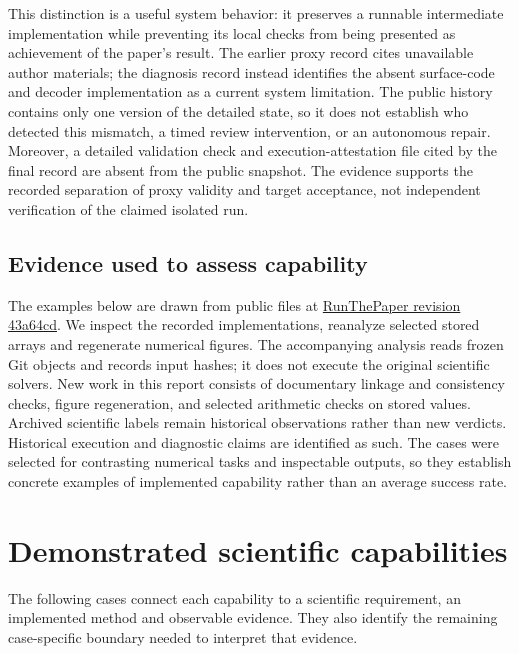 \documentclass[10pt,a4paper]{article}
\begin{document}
This distinction is a useful system behavior: it preserves a runnable
intermediate implementation while preventing its local checks from being
presented as achievement of the paper's result. The earlier proxy record
cites unavailable author materials; the diagnosis record instead
identifies the absent surface-code and decoder implementation as a
current system limitation. The public history contains only one version
of the detailed state, so it does not establish who detected this
mismatch, a timed review intervention, or an autonomous repair.
Moreover, a detailed validation check and execution-attestation file
cited by the final record are absent from the public snapshot. The
evidence supports the recorded separation of proxy validity and target
acceptance, not independent verification of the claimed isolated run.

\subsection{Evidence used to assess
capability}\label{evidence-used-to-assess-capability}

The examples below are drawn from public files at
\href{https://github.com/xi-zhao/RunThePaper/tree/43a64cd03824edb136b549f352412e8d263d9361}{RunThePaper
revision 43a64cd}. We inspect the recorded implementations, reanalyze
selected stored arrays and regenerate numerical figures. The
accompanying analysis reads frozen Git objects and records input hashes;
it does not execute the original scientific solvers. New work in this
report consists of documentary linkage and consistency checks, figure
regeneration, and selected arithmetic checks on stored values. Archived
scientific labels remain historical observations rather than new
verdicts. Historical execution and diagnostic claims are identified as
such. The cases were selected for contrasting numerical tasks and
inspectable outputs, so they establish concrete examples of implemented
capability rather than an average success rate.

\section{Demonstrated scientific
capabilities}\label{demonstrated-scientific-capabilities}

The following cases connect each capability to a scientific requirement,
an implemented method and observable evidence. They also identify the
remaining case-specific boundary needed to interpret that evidence.
\end{document}
